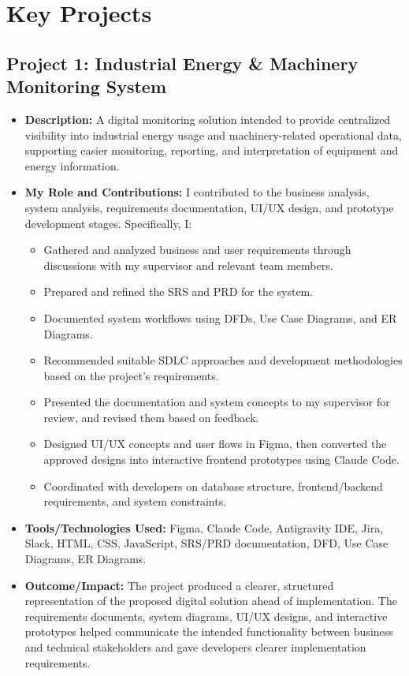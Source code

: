 \section{Key Projects}

\subsection{Project 1: Industrial Energy \& Machinery Monitoring System}
\begin{itemize}
    \item \textbf{Description:} A digital monitoring solution intended to provide centralized visibility into industrial energy usage and machinery-related operational data, supporting easier monitoring, reporting, and interpretation of equipment and energy information.
    \item \textbf{My Role and Contributions:} I contributed to the business analysis, system analysis, requirements documentation, UI/UX design, and prototype development stages. Specifically, I:
    \begin{itemize}
        \item Gathered and analyzed business and user requirements through discussions with my supervisor and relevant team members.
        \item Prepared and refined the SRS and PRD for the system.
        \item Documented system workflows using DFDs, Use Case Diagrams, and ER Diagrams.
        \item Recommended suitable SDLC approaches and development methodologies based on the project's requirements.
        \item Presented the documentation and system concepts to my supervisor for review, and revised them based on feedback.
        \item Designed UI/UX concepts and user flows in Figma, then converted the approved designs into interactive frontend prototypes using Claude Code.
        \item Coordinated with developers on database structure, frontend/backend requirements, and system constraints.
    \end{itemize}
    \item \textbf{Tools/Technologies Used:} Figma, Claude Code, Antigravity IDE, Jira, Slack, HTML, CSS, JavaScript, SRS/PRD documentation, DFD, Use Case Diagrams, ER Diagrams.
    \item \textbf{Outcome/Impact:} The project produced a clearer, structured representation of the proposed digital solution ahead of implementation. The requirements documents, system diagrams, UI/UX designs, and interactive prototypes helped communicate the intended functionality between business and technical stakeholders and gave developers clearer implementation requirements.
\end{itemize}

